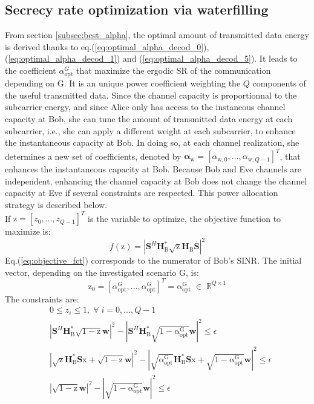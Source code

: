 \documentclass[journal,comsoc]{IEEEtran}
\newcommand{\module}[1]{\left|#1\right|}
\newcommand{\HB}{\textbf{H}_{\text{B}}}
\newcommand{\spread}{\textbf{S}}
\newcommand{\w}{\textbf{w}}
\newcommand{\mat}[1]{\boldsymbol{\mathrm{#1}}}
\begin{document}
\subsection{Secrecy rate optimization via waterfilling}
\label{subsec:perf_waterf}
From section \ref{subsec:best_alpha}, the optimal amount of transmitted data energy is derived thanks to eq.(\ref{eq:optimal_alpha_decod_0}), (\ref{eq:optimal_alpha_decod_1}) and (\ref{eq:optimal_alpha_decod_5}). It leads to the coefficient $\alpha_{\text{opt}}^G$ that maximize the ergodic SR of the communication depending on $\mat{G}$. It is an unique power coefficient weighting the $Q$ components of the useful transmitted data.  Since the channel capacity is proportionnal to the subcarrier energy, and since Alice only has access to the instaneous channel capacity at Bob, she can tune the amount of transmitted data energy at each subcarrier, i.e., she can apply a different weight at each subcarrier, to enhance the instantaneous capacity at Bob. In doing so, at each channel realization, she determines a new set of coefficients, denoted by $\boldsymbol\alpha_{\text{w}} = [\alpha_{\text{w},0},...,\alpha_{\text{w},Q-1}]^T $, that enhances the instantaneous capacity at Bob. Because Bob and Eve channels are independent, enhancing the channel capacity at Bob does not change the channel capacity at Eve if several constraints are respected. This power allocation strategy is described below. \\
If $\mat{z} = [z_0,...,z_{Q-1}]^T$ is the variable to optimize, the objective function to maximize is:
\begin{equation}
	f(\mat{z}) = \left| \spread^H \HB^* \sqrt{\mat{z}} \HB \spread \right|^2
	\label{eq:objective_fct}
\end{equation}
Eq.(\ref{eq:objective_fct}) corresponds to the numerator of Bob's SINR. The initial vector, depending on the investigated scenario $\mat{G}$, is:
\begin{equation}
	\mat{z}_0 =\left[\alpha_{\text{opt}}^G , ... ,\alpha_{\text{opt}}^G \right]^T = \mat{\alpha_{\text{opt}}^G} \; \in \; \mathbb{R}^{Q\times 1}
\end{equation}
The constraints are:
\begin{align}
	& 0 \leq z_i \leq 1 , \; \forall \; i = 0,...,Q-1  \label{eq:constraint1}\\
	& \left| \spread^H \HB^* \sqrt{\mat{1}- \mat{z}} \w  \right|^2 -  \left| \spread^H \HB^* \sqrt{\mat{1}- \mat{\alpha_{\text{opt}}^G}} \w  \right|^2 \leq \epsilon \label{eq:constraint2}\\
	&\module{\sqrt{\mat{z}} \HB^* \spread \mat{x} + \sqrt{\mat{1}-\mat{z}}\w }^2   - \module{\sqrt{\mat{\alpha_{\text{opt}}^G}}  \HB^* \spread \mat{x} + \sqrt{1-\mat{\alpha_{\text{opt}}^G}} \w }^2 \leq \epsilon \label{eq:constraint3}\\
	& \module{\sqrt{\mat{1}- \mat{z}}\w}^2 - \module{\sqrt{\mat{1}- \mat{\alpha_{\text{opt}}^G}}\w}^2 \leq \epsilon \label{eq:constraint4}
\end{align} 
\end{document}
